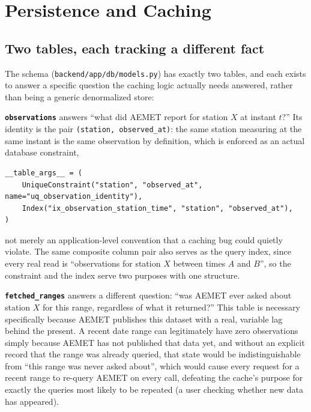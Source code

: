 \documentclass[11pt,a4paper]{article}
\begin{document}
\section{Persistence and Caching}
\label{sec:caching}

\subsection{Two tables, each tracking a different fact}

The schema (\texttt{backend/app/db/models.py}) has exactly two tables, and
each exists to answer a specific question the caching logic actually needs
answered, rather than being a generic denormalized store:

\textbf{\texttt{observations}} answers ``what did AEMET report for station
$X$ at instant $t$?'' Its identity is the pair \texttt{(station,
observed\_at)}: the same station measuring at the same instant is the same
observation by definition, which is enforced as an actual database
constraint,
\begin{lstlisting}[caption={The observation's real identity, enforced by the database, not just application convention. \texttt{backend/app/db/models.py}, lines 41--44.}]
__table_args__ = (
    UniqueConstraint("station", "observed_at", name="uq_observation_identity"),
    Index("ix_observation_station_time", "station", "observed_at"),
)
\end{lstlisting}
not merely an application-level convention that a caching bug could quietly
violate. The same composite column pair also serves as the query index,
since every real read is ``observations for station $X$ between times $A$
and $B$'', so the constraint and the index serve two purposes with one
structure.

\textbf{\texttt{fetched\_ranges}} answers a different question: ``was
AEMET ever asked about station $X$ for this range, regardless of what it
returned?'' This table is necessary specifically because AEMET publishes
this dataset with a real, variable lag behind the present. A recent date
range can legitimately have zero observations simply because AEMET has not
published that data yet, and without an explicit record that the range was
already queried, that state would be indistinguishable from ``this range
was never asked about'', which would cause every request for a recent
range to re-query AEMET on every call, defeating the cache's purpose for
exactly the queries most likely to be repeated (a user checking whether
new data has appeared).
\end{document}
